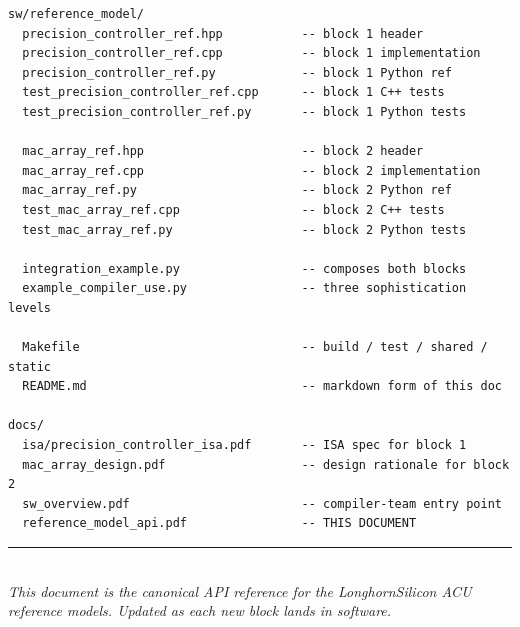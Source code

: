 \documentclass[11pt]{article}
\begin{document}
\begin{lstlisting}[basicstyle=\ttfamily\small]
sw/reference_model/
  precision_controller_ref.hpp           -- block 1 header
  precision_controller_ref.cpp           -- block 1 implementation
  precision_controller_ref.py            -- block 1 Python ref
  test_precision_controller_ref.cpp      -- block 1 C++ tests
  test_precision_controller_ref.py       -- block 1 Python tests

  mac_array_ref.hpp                      -- block 2 header
  mac_array_ref.cpp                      -- block 2 implementation
  mac_array_ref.py                       -- block 2 Python ref
  test_mac_array_ref.cpp                 -- block 2 C++ tests
  test_mac_array_ref.py                  -- block 2 Python tests

  integration_example.py                 -- composes both blocks
  example_compiler_use.py                -- three sophistication levels

  Makefile                               -- build / test / shared / static
  README.md                              -- markdown form of this doc

docs/
  isa/precision_controller_isa.pdf       -- ISA spec for block 1
  mac_array_design.pdf                   -- design rationale for block 2
  sw_overview.pdf                        -- compiler-team entry point
  reference_model_api.pdf                -- THIS DOCUMENT
\end{lstlisting}

\vspace{0.5in}
\noindent\rule{\textwidth}{0.4pt}\\
\noindent\small\textit{This document is the canonical API reference
for the LonghornSilicon ACU reference models. Updated as each new
block lands in software.}
\end{document}
